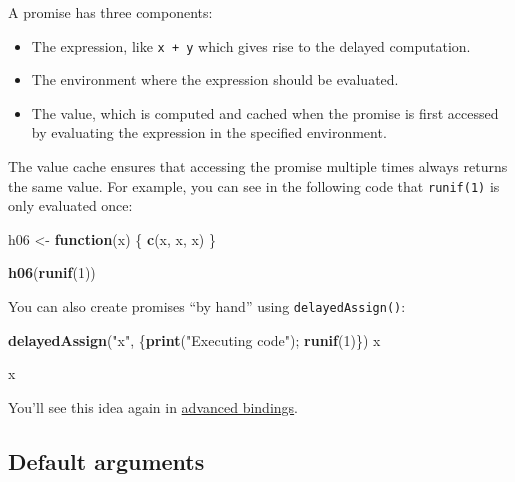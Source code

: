 \documentclass[]{book}
\newenvironment{Shaded}{\begin{snugshade}}{\end{snugshade}}
\newcommand{\ControlFlowTok}[1]{\textcolor[rgb]{0.13,0.29,0.53}{\textbf{#1}}}
\newcommand{\DecValTok}[1]{\textcolor[rgb]{0.00,0.00,0.81}{#1}}
\newcommand{\KeywordTok}[1]{\textcolor[rgb]{0.13,0.29,0.53}{\textbf{#1}}}
\newcommand{\NormalTok}[1]{#1}
\newcommand{\StringTok}[1]{\textcolor[rgb]{0.31,0.60,0.02}{#1}}
\theoremstyle{definition}
\theoremstyle{definition}
\theoremstyle{definition}
\theoremstyle{remark}
\begin{document}
A promise has three components:

\begin{itemize}
\item
  The expression, like \texttt{x\ +\ y} which gives rise to the delayed
  computation.
\item
  The environment where the expression should be evaluated.
\item
  The value, which is computed and cached when the promise is first
  accessed by evaluating the expression in the specified environment.
\end{itemize}

The value cache ensures that accessing the promise multiple times always
returns the same value. For example, you can see in the following code
that \texttt{runif(1)} is only evaluated once:

\begin{Shaded}
\begin{Highlighting}[]
\NormalTok{h06 <-}\StringTok{ }\ControlFlowTok{function}\NormalTok{(x) \{ }
  \KeywordTok{c}\NormalTok{(x, x, x)  }
\NormalTok{\}}

\KeywordTok{h06}\NormalTok{(}\KeywordTok{runif}\NormalTok{(}\DecValTok{1}\NormalTok{))}
\end{Highlighting}
\end{Shaded}

You can also create promises ``by hand'' using \texttt{delayedAssign()}:

\begin{Shaded}
\begin{Highlighting}[]
\KeywordTok{delayedAssign}\NormalTok{(}\StringTok{"x"}\NormalTok{, \{}\KeywordTok{print}\NormalTok{(}\StringTok{"Executing code"}\NormalTok{); }\KeywordTok{runif}\NormalTok{(}\DecValTok{1}\NormalTok{)\})}
\NormalTok{x}
\end{Highlighting}
\end{Shaded}

\begin{Shaded}
\begin{Highlighting}[]
\NormalTok{x}
\end{Highlighting}
\end{Shaded}

You'll see this idea again in
\protect\hyperlink{advanced-bindings}{advanced bindings}.

\hypertarget{default-arguments}{%
\subsection{Default arguments}\label{default-arguments}}
\end{document}
